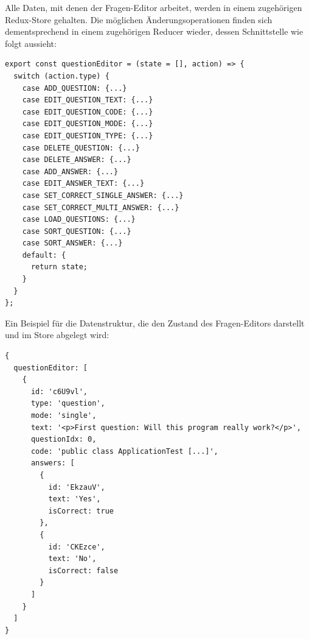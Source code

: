 Alle Daten, mit denen der Fragen-Editor arbeitet, werden in einem zugehörigen Redux-Store gehalten. Die möglichen Änderungsoperationen finden sich dementsprechend in einem zugehörigen Reducer wieder, dessen Schnittstelle wie folgt aussieht:


\begin{minipage}{\linewidth}
\begin{lstlisting}[caption={Auszug aus dem Reducer für den Fragen-Editor (aus: src/server/reducers/questions.js)}]
export const questionEditor = (state = [], action) => {
  switch (action.type) {
    case ADD_QUESTION: {...}
    case EDIT_QUESTION_TEXT: {...}
    case EDIT_QUESTION_CODE: {...}
    case EDIT_QUESTION_MODE: {...}
    case EDIT_QUESTION_TYPE: {...}
    case DELETE_QUESTION: {...}
    case DELETE_ANSWER: {...}
    case ADD_ANSWER: {...}
    case EDIT_ANSWER_TEXT: {...}
    case SET_CORRECT_SINGLE_ANSWER: {...}
    case SET_CORRECT_MULTI_ANSWER: {...}
    case LOAD_QUESTIONS: {...}
    case SORT_QUESTION: {...}
    case SORT_ANSWER: {...}
    default: {
      return state;
    }
  }
};
\end{lstlisting}
\end{minipage}


Ein Beispiel für die Datenstruktur, die den Zustand des Fragen-Editors darstellt und im Store abgelegt wird:

\begin{minipage}{\linewidth}
\begin{lstlisting}[caption={Zustand des Fragen-Editors innerhalb des Redux-Store mit einer einzigen Frage.}]
{
  questionEditor: [
    {
      id: 'c6U9vl',
      type: 'question',
      mode: 'single',
      text: '<p>First question: Will this program really work?</p>',
      questionIdx: 0,
      code: 'public class ApplicationTest [...]',
      answers: [
        {
          id: 'EkzauV',
          text: 'Yes',
          isCorrect: true
        },
        {
          id: 'CKEzce',
          text: 'No',
          isCorrect: false
        }
      ]
    }
  ]
}
\end{lstlisting}
\end{minipage}